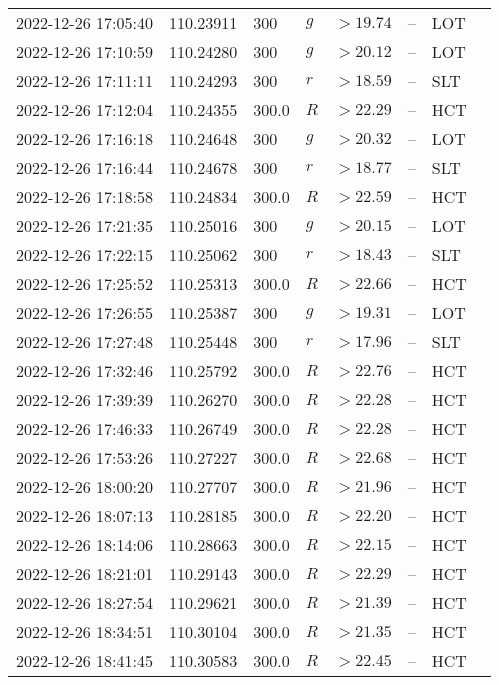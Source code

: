 \documentclass{nature_plusfigure}
\begin{document}
\begin{supplement}
\begin{center}
\begin{longtable}{llllllll}
2022-12-26 17:05:40 & 110.23911 & 300 & $g$ & $>19.74$ & -- & LOT &  \\ 
2022-12-26 17:10:59 & 110.24280 & 300 & $g$ & $>20.12$ & -- & LOT &  \\ 
2022-12-26 17:11:11 & 110.24293 & 300 & $r$ & $>18.59$ & -- & SLT &  \\ 
2022-12-26 17:12:04 & 110.24355 & 300.0 & $R$ & $>22.29$ & -- & HCT &  \\ 
2022-12-26 17:16:18 & 110.24648 & 300 & $g$ & $>20.32$ & -- & LOT &  \\ 
2022-12-26 17:16:44 & 110.24678 & 300 & $r$ & $>18.77$ & -- & SLT &  \\ 
2022-12-26 17:18:58 & 110.24834 & 300.0 & $R$ & $>22.59$ & -- & HCT &  \\ 
2022-12-26 17:21:35 & 110.25016 & 300 & $g$ & $>20.15$ & -- & LOT &  \\ 
2022-12-26 17:22:15 & 110.25062 & 300 & $r$ & $>18.43$ & -- & SLT &  \\ 
2022-12-26 17:25:52 & 110.25313 & 300.0 & $R$ & $>22.66$ & -- & HCT &  \\ 
2022-12-26 17:26:55 & 110.25387 & 300 & $g$ & $>19.31$ & -- & LOT &  \\ 
2022-12-26 17:27:48 & 110.25448 & 300 & $r$ & $>17.96$ & -- & SLT &  \\ 
2022-12-26 17:32:46 & 110.25792 & 300.0 & $R$ & $>22.76$ & -- & HCT &  \\ 
2022-12-26 17:39:39 & 110.26270 & 300.0 & $R$ & $>22.28$ & -- & HCT &  \\ 
2022-12-26 17:46:33 & 110.26749 & 300.0 & $R$ & $>22.28$ & -- & HCT &  \\ 
2022-12-26 17:53:26 & 110.27227 & 300.0 & $R$ & $>22.68$ & -- & HCT &  \\ 
2022-12-26 18:00:20 & 110.27707 & 300.0 & $R$ & $>21.96$ & -- & HCT &  \\ 
2022-12-26 18:07:13 & 110.28185 & 300.0 & $R$ & $>22.20$ & -- & HCT &  \\ 
2022-12-26 18:14:06 & 110.28663 & 300.0 & $R$ & $>22.15$ & -- & HCT &  \\ 
2022-12-26 18:21:01 & 110.29143 & 300.0 & $R$ & $>22.29$ & -- & HCT &  \\ 
2022-12-26 18:27:54 & 110.29621 & 300.0 & $R$ & $>21.39$ & -- & HCT &  \\ 
2022-12-26 18:34:51 & 110.30104 & 300.0 & $R$ & $>21.35$ & -- & HCT &  \\ 
2022-12-26 18:41:45 & 110.30583 & 300.0 & $R$ & $>22.45$ & -- & HCT &  \\ 

\end{longtable}
\end{center}
\end{supplement}
\end{document}
